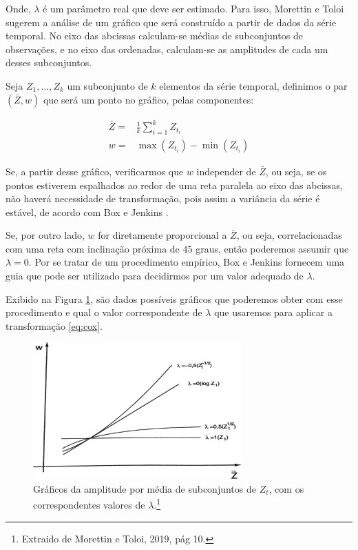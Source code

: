 Onde, $\lambda$ é um parâmetro real que deve ser estimado. Para isso, Morettin e Toloi \citep{morettin} sugerem a análise de um gráfico que será construído a partir de dados da série temporal. No eixo das abcissas calculam-se médias de subconjuntos de observações, e no eixo das ordenadas, calculam-se as amplitudes de cada um desses subconjuntos.

Seja $Z_1, \ldots, Z_k$ um subconjunto de $k$ elementos da série temporal, definimos o par $(\bar{Z}, w)$ que será um ponto no gráfico, pelas componentes:

\[
\begin{array}{rl}
\bar{Z} =& \frac{1}{k}\sum_{i=1}^k Z_{t_i}\\
w =& \max(Z_{t_i}) - \min(Z_{t_i})
\end{array}
\]

Se, a partir desse gráfico, verificarmos que $w$ independer de $\bar{Z}$, ou seja, se os pontos estiverem espalhados ao redor de uma reta paralela ao eixo das abcissas, não haverá necessidade de transformação, pois assim a variância da série é estável, de acordo com Box e Jenkins \citep{box}. 

Se, por outro lado, $w$ for diretamente proporcional a $\bar{Z}$, ou seja, correlacionadas com uma reta com inclinação próxima de $45$ graus, então poderemos assumir que $\lambda = 0$. Por se tratar de um procedimento empírico, Box e Jenkins \citep{box} fornecem uma guia que pode ser utilizado para decidirmos por um valor adequado de $\lambda$. 

Exibido na Figura \ref{fig:box}, são dados possíveis gráficos que poderemos obter com esse procedimento e qual o valor correspondente de $\lambda$ que usaremos para aplicar a transformação \ref{eq:cox}.

\begin{figure}[htb]
\centering
\includegraphics[width=8cm]{figuras/box}
\caption{Gráficos da amplitude por média de subconjuntos de $Z_t$, com os correspondentes valores de $\lambda$.\footnote{Extraido de Morettin e Toloi, 2019, pág 10.}}
\label{fig:box}
\end{figure} 



